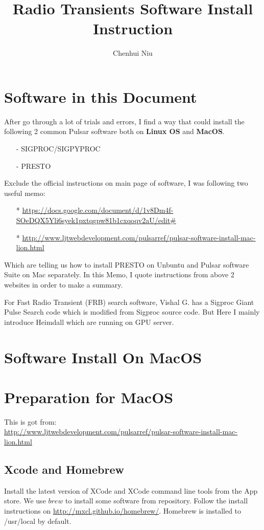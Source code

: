 \documentclass{article}
\begin{document}
\title{Radio Transients Software Install Instruction}
\author{Chenhui Niu}
\maketitle
\section*{Software in this Document}
After go through a lot of trials and errors, I find a way that could install the following 2 common Pulsar software both on \textbf{Linux OS} and \textbf{MacOS}.  
\begin{itemize}
\item[-] SIGPROC/SIGPYPROC
\item[-] PRESTO
\end{itemize}
Exclude the official instructions on main page of software, I was following two useful memo:
\begin{itemize}
\item[*] \url{https://docs.google.com/document/d/1v8Dm4f-SOeDQX5Yli6syek1pxtqgpw81b1cxqoqv2aU/edit#}

\item[*] \url{http://www.ljtwebdevelopment.com/pulsarref/pulsar-software-install-mac-lion.html}
\end{itemize}

Which are telling us how to install PRESTO on Unbuntu and Pulsar software Suite on Mac separately.
In this Memo,  I quote instructions from above 2 websites in order to make a summary. 

For Fast Radio Transient (FRB) search software, Vishal G. has a Sigproc Giant Pulse Search code which is modified from Sigproc source code. But Here I mainly introduce Heimdall which are running on GPU server. 

\section*{Software Install On MacOS}
\section{Preparation for MacOS}
This is got from:\\

 \url{http://www.ljtwebdevelopment.com/pulsarref/pulsar-software-install-mac-lion.html}

\subsection{Xcode and Homebrew}
Install the latest version of XCode and XCode command line tools from the App store. We use $brew$ to install some software from repository. Follow the install instructions on \url{http://mxcl.github.io/homebrew/}. Homebrew is installed to /usr/local by default.  
\end{document}
